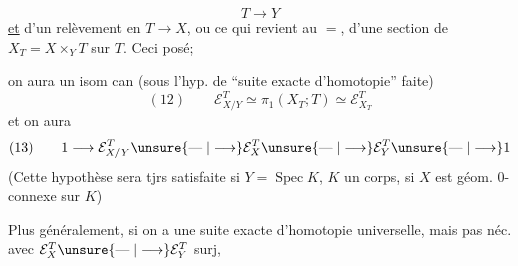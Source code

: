 
\[
T\longrightarrow Y
\]
\uline{et} d'un relèvement en $T\longrightarrow X$, ou ce qui revient au $=$, d'une section de $X_T=X\times_YT$ sur $T$. Ceci posé;


on aura un isom can (sous l'hyp. de ``suite exacte d'homotopie'' faite)
\[
(12)\qquad \mathcal E_{X/Y}^T\simeq\pi_1(X_T;T)\simeq\mathcal E_{X_T}^T
\]
et on aura
\[
(13)\qquad 1\longrightarrow\mathcal E_{X/Y}^T\unsure{\mathrel{\text{---}}|\longrightarrow}\mathcal E_X^T\unsure{\mathrel{\text{---}}|\longrightarrow}\mathcal E_Y^T\unsure{\mathrel{\text{---}}|\longrightarrow}1
\]
(Cette hypothèse sera tjrs satisfaite si $Y=\operatorname{Spec}K$, $K$ un corps, si $X$ est géom. $0$-connexe sur $K$)

Plus généralement, si on a une suite exacte d'homotopie universelle, mais pas néc. avec $\mathcal E_X^T\unsure{\mathrel{\text{---}}|\longrightarrow}\mathcal E_Y^T$ surj,


